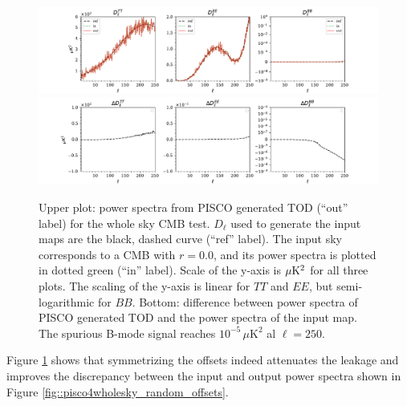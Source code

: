 \documentclass[a4paper,11pt]{article}
\begin{document}
\begin{figure}
	\centering
	\includegraphics[width=1\textwidth, trim = {2.2cm 0.0cm 2.3cm 0.0cm}, clip ]{figures/whole_sky_symmetric_offsets.pdf}
	\includegraphics[width=1\textwidth, trim = {2.2cm 0.0cm 2.3cm 0.0cm}, clip ]{figures/whole_sky_symmetric_offsets_residuals.pdf}
	\caption{Upper plot: power spectra from PISCO generated TOD (``out'' label) for the whole sky CMB test. $D_\ell$ used to generate the input maps are the black, dashed curve (``ref'' label). The input sky corresponds to a CMB with $r=0.0$, and its power spectra is plotted in dotted green (``in'' label). Scale of the y-axis is $\mu\rm{K}^2$ for all three plots. The scaling of the y-axis is linear for $TT$ and $EE$, but semi-logarithmic for $BB$. Bottom: difference between power spectra of PISCO generated TOD and the power spectra of the input map. The spurious B-mode signal reaches $10^{-5} \, \mu\mathrm{K}^2$ al $\ell=250$. }
	\label{fig::pisco4wholesky_symm_offsets}
\end{figure}
Figure \ref{fig::pisco4wholesky_symm_offsets} shows that symmetrizing the offsets indeed attenuates the leakage and improves the discrepancy between the input and output power spectra shown in Figure \ref{fig::pisco4wholesky_random_offsets}.


\end{document}
